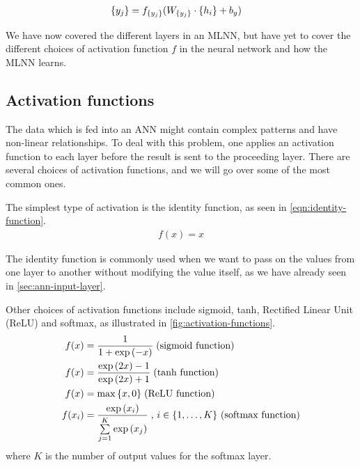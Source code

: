 \begin{align}
    \label{eqn:output-layer-ann}
    \left\{ {y}_{j} \right\} &= f_{\left\{ {y}_{j} \right\}}(W_{\left\{ {y}_{j} \right\}} \cdot \left\{ {h}_{i} \right\} + b_y)
\end{align}

We have now covered the different layers in an MLNN, but have yet to cover the different choices of activation function $f$ in the neural network and how the MLNN learns.

\subsection{Activation functions}
\label{sec:activation-functions-ann}
The data which is fed into an ANN might contain complex patterns and have non-linear relationships. To deal with this problem, one applies an activation function to each layer before the result is sent to the proceeding layer. There are several choices of activation functions, and we will go over some of the most common ones.

The simplest type of activation is the identity function, as seen in \cref{eqn:identity-function}.
\begin{align}
    \label{eqn:identity-function}
    f(x) = x
\end{align}

The identity function is commonly used when we want to pass on the values from one layer to another without modifying the value itself, as we have already seen in \cref{sec:ann-input-layer}.

Other choices of activation functions include  sigmoid, tanh, Rectified Linear Unit (ReLU) and softmax, as illustrated in \cref{fig:activation-functions}.
\begin{align}
    \label{eqn:sigmoid-function}
    f(x) &= \frac{1}{1 + \exp{ \left( -x \right) }} \thickspace \text{(sigmoid function)} \\
    \label{eqn:tanh-function}
    f(x) &= \frac{\exp{ \left( 2x \right) } - 1}{\exp{ \left( 2x \right) } + 1} \thickspace \text{(tanh function)} \\
    \label{eqn:relu-function}
    f(x) &= \max{\left\{ x, 0 \right\}} \thickspace \text{(ReLU function)} \\
    \label{eqn:softmax-function}
    f(x_i) &= \frac{\exp \left( x_i \right)}{\sum\limits_{j=1}^{K} \exp \left( x_j \right)} \thickspace \text{, $i \in \left\{ 1, \ldots, K \right\}$ (softmax function)}
\end{align}
where $K$ is the number of output values for the softmax layer.


